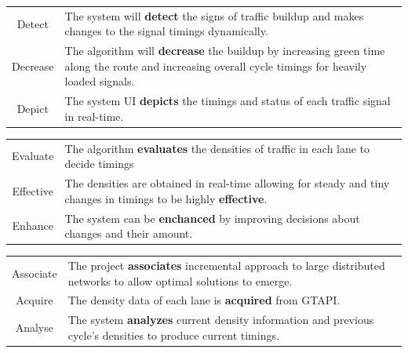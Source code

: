 \documentclass[12pt,a4paper,final]{report}
\begin{document}
\newpage \vspace*{2cm}

\begin{table}[!h]
	\centering
	\begin{Large}
	\begin{tabular}{| c | p{9cm} |}
		\toprule
		Detect & The system will \textbf{detect} the signs of traffic buildup and makes changes to the signal timings dynamically.\\
		Decrease & The algorithm will \textbf{decrease} the buildup by increasing green time along the route and increasing overall cycle timings for heavily loaded signals.\\
		Depict & The system UI \textbf{depicts} the timings and status of each traffic signal in real-time.\\
		\bottomrule
	\end{tabular}
	\end{Large}
\end{table}

\vspace*{2cm}

\begin{table}[!h]
	\centering
	\begin{Large}
	\begin{tabular}{| c | p{9cm} |}
		\hline
		Evaluate & The algorithm \textbf{evaluates} the densities of traffic in each lane to decide timings\\
		Effective & The densities are obtained in real-time allowing for steady and tiny changes in timings to be highly \textbf{effective}.\\
		Enhance & The system can be \textbf{enchanced} by improving decisions about changes and their amount.\\
		\hline
	\end{tabular}
	\end{Large}
\end{table}

\newpage \vspace*{5cm}

\begin{table}[!h]
	\centering
	\begin{Large}
	\begin{tabular}{| c | p{9cm} |}
		\hline
		Associate & The project \textbf{associates} incremental approach to large distributed networks to allow optimal solutions to emerge.\\
		Acquire & The density data of each lane is \textbf{acquired} from GTAPI.\\
		Analyse & The system \textbf{analyzes} current density information and previous cycle's densities to produce current timings.\\
		\hline
	\end{tabular}
	\end{Large}
\end{table}
\end{document}
